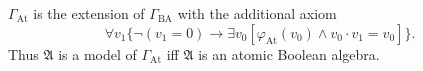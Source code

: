 $\Gamma_{\text{At}}$ is the extension of $\Gamma_{\text{BA}}$ with the additional axiom
$$\forall v_1\{\neg(v_1 = 0) \rightarrow \exists v_0[\varphi_{\text{At}}(v_0) \land v_0 \cdot v_1 = v_0]\}.$$
Thus $\mathfrak{A}$ is a model of $\Gamma_{\text{At}}$ iff $\mathfrak{A}$ is an atomic Boolean algebra.
